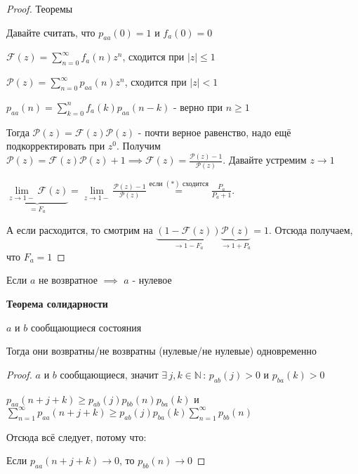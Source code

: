 \begin{proof}
    Теоремы

    Давайте считать, что $p_{aa} (0) = 1$ и $f_a (0) = 0$

    $\mathcal{F} (z) = \sum_{n=0}^{\infty} f_a (n) z^n$, сходится при $|z| \leqslant 1$

    $\mathcal{P} (z) = \sum_{n=0}^{\infty} p_{aa} (n)z^n$, сходится при $|z| < 1$

    $p_{aa} (n) = \sum_{k = 0}^{n} f_a (k) p_{aa} (n - k)$ - верно при $n \geqslant 1$

    Тогда $\mathcal{P} (z) = \mathcal{F} (z) \mathcal{P} (z)$ - почти верное равенство, надо ещё подкорректировать при $z^0$.
    Получим $\mathcal{P} (z) = \mathcal{F} (z) \mathcal{P} (z) + 1 \implies \mathcal{F} (z) = \frac{\mathcal{P} (z) - 1}{\mathcal{P} (z)}$. Давайте устремим $z \to 1$
    
    $\underbrace{\lim\limits_{z \to 1-} \mathcal{F} (z)}_{=F_a} = \lim\limits_{z \to 1-} \frac{\mathcal{P} (z) - 1}{\mathcal{P} (z)} \overset{\text{если $(*)$ сходится}}{=} \frac{P_a}{P_a + 1}$.

    А если расходится, то смотрим на $\underbrace{(1 - \mathcal{F} (z))}_{\to 1 - F_a} \underbrace{\mathcal{P} (z)}_{\to 1 + P_a} = 1$. Отсюда получаем, что $F_a = 1$
\end{proof}

\begin{consequence}
    Если $a$ не возвратное $\implies$ $a$ - нулевое
\end{consequence}

\begin{theorem}
    \textbf{Теорема солидарности}

    $a$ и $b$ сообщающиеся состояния

    Тогда они возвратны/не возвратны (нулевые/не нулевые) одновременно
\end{theorem}

\begin{proof}
    $a$ и $b$ сообщающиеся, значит $\exists \,  j, k \in \mathbb{N} \, : \, p_{ab} (j) > 0$ и $p_{ba} (k) > 0$

    $p_{aa} (n + j + k) \geqslant p_{ab} (j) p_{bb} (n) p_{ba} (k)$ и $\sum\limits_{n = 1}^\infty p_{aa} (n + j + k) \geqslant p_{ab} (j) p_{ba} (k) \sum\limits_{n = 1}^\infty p_{bb} (n)$

    Отсюда всё следует, потому что:

    Если $p_{aa} (n + j + k) \rightarrow 0$, то $p_{bb} (n) \rightarrow 0$
    
\end{proof}

